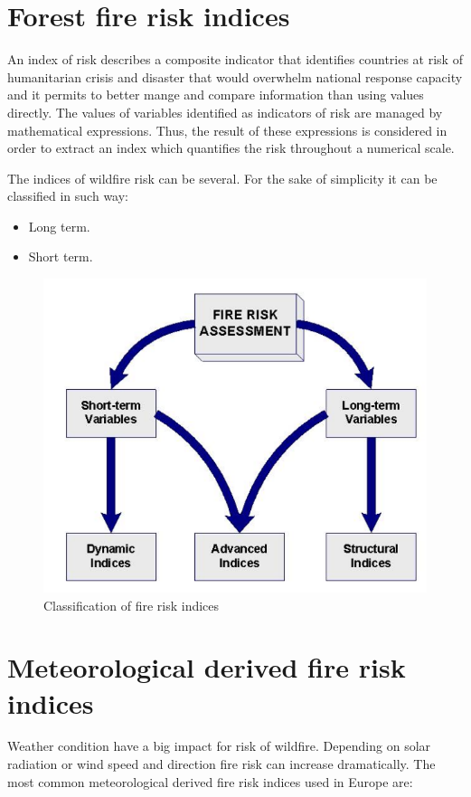 {{\section{Forest fire risk indices}
	An index of risk describes a composite indicator that identifies countries at risk of humanitarian crisis and disaster that would overwhelm national response capacity and it permits to better mange and compare information than using values directly. The values of variables identified as indicators of risk are managed by mathematical expressions. Thus, the result of these expressions is considered in order to extract an index which quantifies the risk throughout a numerical scale.
	
	The indices of wildfire risk can be several. For the sake of simplicity it can be classified in such way:
	
	\begin{itemize}
		\item Long term.
		\item Short term.
	\end{itemize}
	
	\begin{figure}[H]
		\centering
		\includegraphics[width=0.8\linewidth]{images/fire_risk_indices.png}
		\caption{Classification of fire risk indices}
		\label{fig:copernicus_hub}
	\end{figure}

\section{Meteorological derived fire risk indices}
	Weather condition have a big impact for risk of wildfire. Depending on solar radiation  or wind speed and direction fire risk can increase dramatically. The most common meteorological derived fire risk indices used in Europe are:
	
}}

